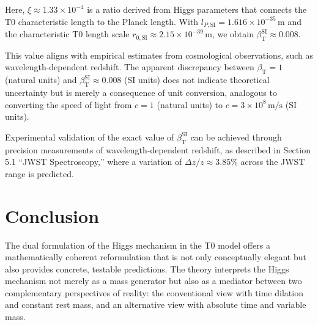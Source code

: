\documentclass[a4paper,12pt]{article}
\newcommand{\betaT}{\beta_{\text{T}}}
\begin{document}
Here, \(\xi \approx 1.33 \times 10^{-4}\) is a ratio derived from Higgs parameters that connects the T0 characteristic length to the Planck length. With \(l_{P,\text{SI}} = 1.616 \times 10^{-35} \, \text{m}\) and the characteristic T0 length scale \(r_{0,\text{SI}} \approx 2.15 \times 10^{-39} \, \text{m}\), we obtain \(\betaT^{\text{SI}} \approx 0.008\).


This value aligns with empirical estimates from cosmological observations, such as wavelength-dependent redshift. The apparent discrepancy between \(\betaT = 1\) (natural units) and \(\betaT^{\text{SI}} \approx 0.008\) (SI units) does not indicate theoretical uncertainty but is merely a consequence of unit conversion, analogous to converting the speed of light from \(c = 1\) (natural units) to \(c = 3 \times 10^8 \, \text{m/s}\) (SI units).

Experimental validation of the exact value of \(\betaT^{\text{SI}}\) can be achieved through precision measurements of wavelength-dependent redshift, as described in Section 5.1 ``JWST Spectroscopy,'' where a variation of \(\Delta z / z \approx 3.85\%\) across the JWST range is predicted.
	
	\section{Conclusion}
	The dual formulation of the Higgs mechanism in the T0 model offers a mathematically coherent reformulation that is not only conceptually elegant but also provides concrete, testable predictions. The theory interprets the Higgs mechanism not merely as a mass generator but also as a mediator between two complementary perspectives of reality: the conventional view with time dilation and constant rest mass, and an alternative view with absolute time and variable mass.
	
\end{document}
